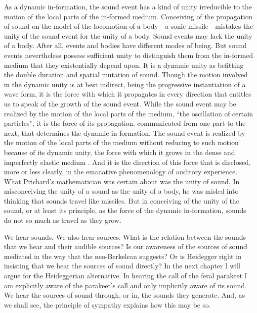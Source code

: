 As a dynamic in-formation, the sound event has a kind of unity irreducible to the motion of the local parts of the in-formed medium. Conceiving of the propagation of sound on the model of the locomotion of a body---a sonic missile---mistakes the unity of the sound event for the unity of a body. Sound events may lack the unity of a body. After all, events and bodies have different modes of being. But sound events nevertheless possess sufficient unity to distinguish them from the in-formed medium that they existentially depend upon. It is a dynamic unity as befitting the double duration and spatial mutation of sound. Though the motion involved in the dynamic unity is at best indirect, being the progressive instantiation of a wave form, it is the force with which it propagates in every direction that entitles us to speak of the growth of the sound event.  While the sound event may be realized by the motion of the local parts of the medium, ``the oscillation of certain particles'', it is the force of its propagation, communicated from one part to the next, that determines the dynamic in-formation. The sound event is realized by the motion of the local parts of the medium without reducing to such motion because of its dynamic unity, the force with which it grows in the dense and imperfectly elastic medium \citep[on dynamic principles of unity see][]{Johnston:2006js}. And it is the direction of this force that is disclosed, more or less clearly, in the emanative phenomenology of auditory experience. What Prichard's mathematician was certain about was the unity of sound. In misconceiving the unity of a sound as the unity of a body, he was misled into thinking that sounds travel like missiles. But in conceiving of the unity of the sound, or at least its principle, as the force of the dynamic in-formation, sounds do not so much as travel as they grow.

We hear sounds. We also hear sources. What is the relation between the sounds that we hear and their audible sources? Is our awareness of the sources of sound mediated in the way that the neo-Berkelean suggests? Or is Heidegger right in insisting that we hear the sources of sound directly? In the next chapter I will argue for the Heideggerian alternative. In hearing the call of the feral parakeet I am explicitly aware of the parakeet's call and only implicitly aware of its sound. We hear the sources of sound through, or in, the sounds they generate. And, as we shall see, the principle of sympathy explains how this may be so.


